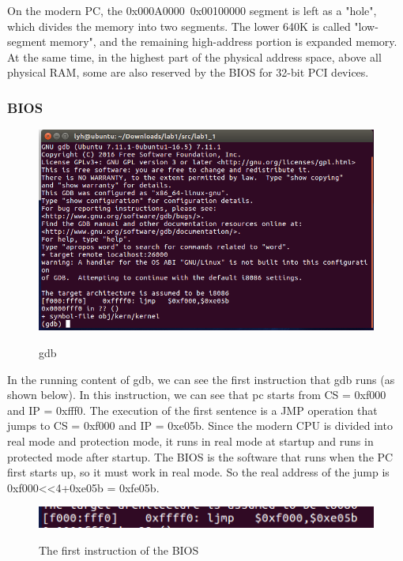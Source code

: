 On the modern PC, the 0x000A0000~0x00100000 segment is left as a "hole", which divides the memory into two segments. The lower 640K is called "low-segment memory", and the remaining high-address portion is expanded memory. At the same time, in the highest part of the physical address space, above all physical RAM, some are also reserved by the BIOS for 32-bit PCI devices.
\subsubsection{BIOS}
\begin{figure}[H]
  \centering
  \includegraphics[width=0.8\linewidth]{figure/gdb}\\
  \caption{gdb}\label{2}
\end{figure}

In the running content of gdb, we can see the first instruction that gdb runs (as shown below). In this instruction, we can see that pc starts from CS = 0xf000 and IP = 0xfff0. The execution of the first sentence is a JMP operation that jumps to CS = 0xf000 and IP = 0xe05b. Since the modern CPU is divided into real mode and protection mode, it runs in real mode at startup and runs in protected mode after startup. The BIOS is the software that runs when the PC first starts up, so it must work in real mode. So the real address of the jump is 0xf000<<4+0xe05b = 0xfe05b.



\begin{figure}[H]
  \centering
  \includegraphics[width=0.8\linewidth]{figure/first_commond}\\
  \caption{The first instruction of the BIOS}\label{2}
\end{figure}


